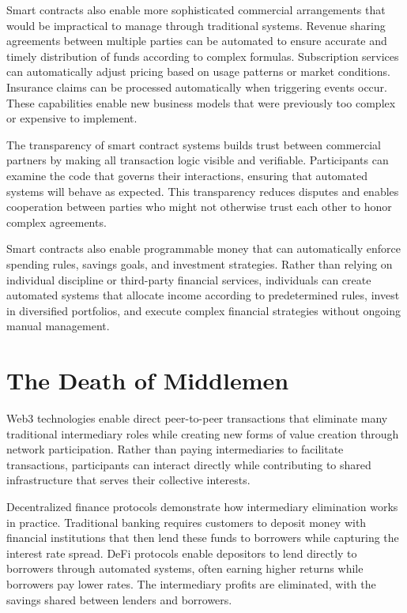 \documentclass[
  Letterpaper,
]{scrbook}
\begin{document}
Smart contracts also enable more sophisticated commercial arrangements
that would be impractical to manage through traditional systems. Revenue
sharing agreements between multiple parties can be automated to ensure
accurate and timely distribution of funds according to complex formulas.
Subscription services can automatically adjust pricing based on usage
patterns or market conditions. Insurance claims can be processed
automatically when triggering events occur. These capabilities enable
new business models that were previously too complex or expensive to
implement.

The transparency of smart contract systems builds trust between
commercial partners by making all transaction logic visible and
verifiable. Participants can examine the code that governs their
interactions, ensuring that automated systems will behave as expected.
This transparency reduces disputes and enables cooperation between
parties who might not otherwise trust each other to honor complex
agreements.

Smart contracts also enable programmable money that can automatically
enforce spending rules, savings goals, and investment strategies. Rather
than relying on individual discipline or third-party financial services,
individuals can create automated systems that allocate income according
to predetermined rules, invest in diversified portfolios, and execute
complex financial strategies without ongoing manual management.

\section{The Death of Middlemen}\label{the-death-of-middlemen}

Web3 technologies enable direct peer-to-peer transactions that eliminate
many traditional intermediary roles while creating new forms of value
creation through network participation. Rather than paying
intermediaries to facilitate transactions, participants can interact
directly while contributing to shared infrastructure that serves their
collective interests.

Decentralized finance protocols demonstrate how intermediary elimination
works in practice. Traditional banking requires customers to deposit
money with financial institutions that then lend these funds to
borrowers while capturing the interest rate spread. DeFi protocols
enable depositors to lend directly to borrowers through automated
systems, often earning higher returns while borrowers pay lower rates.
The intermediary profits are eliminated, with the savings shared between
lenders and borrowers.
\end{document}
